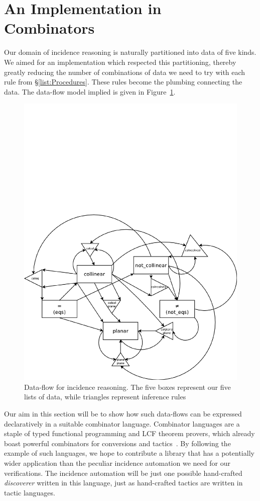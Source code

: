 \section{An Implementation in Combinators}\label{sec:DiscoveryAlgebra}
Our domain of incidence reasoning is naturally partitioned into data of five kinds. We aimed for an implementation which respected this partitioning, thereby greatly reducing the number of combinations of data we need to try with each rule from \S\ref{list:Procedures}. These rules become the plumbing connecting the data. The data-flow model implied is given in Figure~\ref{fig:DataFlow}.

\begin{figure}
\centering\includegraphics[scale=0.5]{automation/DataFlow}
\caption{Data-flow for incidence reasoning. The five boxes represent our five lists of data, while triangles represent inference rules}
\label{fig:DataFlow}
\end{figure}

Our aim in this section will be to show how such data-flows can be expressed declaratively in a suitable combinator language. Combinator languages are a staple of typed functional programming and LCF theorem provers, which already boast powerful combinators for conversions and tactics~\cite{Tactics}. By following the example of such languages, we hope to contribute a library that has a potentially wider application than the peculiar incidence automation we need for our verifications. The incidence automation will be just one possible hand-crafted \emph{discoverer} written in this language, just as hand-crafted tactics are written in tactic languages.

